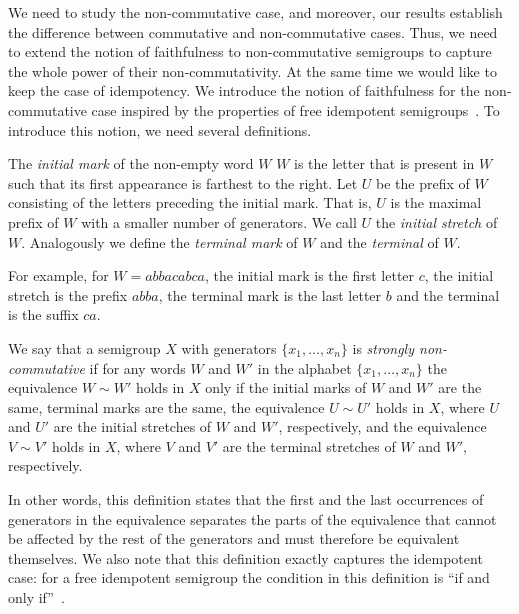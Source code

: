 We need to study the non-commutative case, and moreover, our results
establish the difference between commutative and non-commutative cases. Thus,
we need to extend the notion of faithfulness to non-commutative semigroups to
capture %
the whole power of their non-commutativity.  %
At the same time we would
like to keep the case of idempotency. We introduce the notion of faithfulness
for the non-commutative case inspired by the properties of free idempotent
semigroups~\cite{GreenR52}. To introduce this notion, we need several
definitions.


\begin{definition}
The \emph{initial mark} of
the non-empty word $W$  %
$W$ is the letter that is present in $W$ such that
its first appearance is farthest to the right. Let $U$ be the prefix of $W$
consisting of
the  %
letters preceding the initial mark. That is, $U$ is the maximal
prefix of $W$ with a smaller number of generators. We call $U$ the
%
%
%
%
\emph{initial stretch} %
of $W$. Analogously we define the \emph{terminal mark} of $W$ and
the \emph{terminal} of $W$.
\end{definition}

For example, for $W = abbacabca$, the initial mark is the first letter $c$, the
%
%
initial stretch %
is
the prefix $abba$, the terminal mark is the last letter $b$ and the terminal is the suffix $ca$.

\begin{definition}\label{def:strong_non_commutativity}
We say that a semigroup $X$ with generators $\{x_1,\ldots, x_n\}$ is
\emph{strongly non-commutative} if for any words $W$ and $W'$ in the
alphabet $\{x_1,\ldots, x_n\}$ the equivalence $W\sim W'$ holds in $X$ only if
the initial marks of $W$ and $W'$ are the same, terminal marks are the same,
the equivalence $U \sim U'$ holds in $X$, where $U$ and $U'$ are the
%
%
initial stretches %
of
$W$ and $W'$, respectively, and the equivalence $V \sim V'$ holds in $X$, where
$V$ and $V'$ are the %
terminal stretches  %
of $W$ and $W'$, respectively.
\end{definition}

In other words, this definition states that the first and the last occurrences
of generators in the equivalence separates the parts of the equivalence that
cannot be affected by the rest of the generators and must therefore be
equivalent themselves. We also note that this definition exactly captures the
idempotent case: for a free idempotent semigroup the condition in this
definition is ``if and only if''~\cite{GreenR52}.


